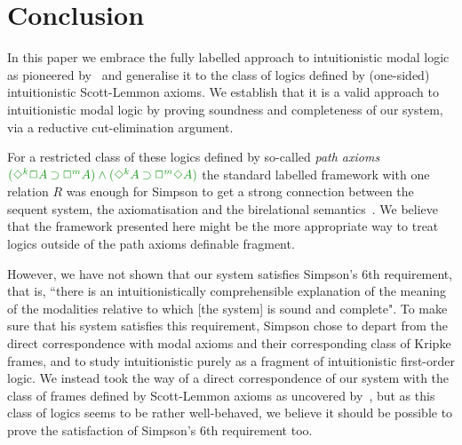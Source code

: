 \section{Conclusion}


In this paper we embrace the fully labelled approach to intuitionistic modal logic as pioneered by~\cite{maffezioli:etal:synthese13} and generalise it to the class of logics defined by (one-sided) intuitionistic Scott-Lemmon axioms.
%
We establish that it is a valid approach to intuitionistic modal logic by proving soundness and completeness of our system, via a reductive cut-elimination argument.

For a restricted class of these logics defined by so-called \emph{path axioms} $\fm{(\DIA^k\BOX A \IMP\BOX^m A) \AND (\DIA^k A \IMP \BOX^m\DIA A)}$ the standard labelled framework with one relation $R$ was enough for Simpson to get a strong connection between the sequent system, the axiomatisation and the birelational semantics~\cite{simpson:phd}.
%
%
We believe that the framework presented here might be the more appropriate way to treat logics outside of the path axioms definable fragment.

However, we have not shown that our system satisfies Simpson's 6th requirement, that is, ``there is an intuitionistically comprehensible explanation of the meaning of the modalities relative to which [the system] is sound and complete".
%
To make sure that his system satisfies this requirement, Simpson chose to depart from the direct correspondence with modal axioms and their corresponding class of Kripke frames, and to study intuitionistic purely as a fragment of intuitionistic first-order logic.
%
We instead took the way of a direct correspondence of our system with the class of frames defined by Scott-Lemmon axioms as uncovered by~\cite{plotkin:stirling:86}, but as this class of logics seems to be rather well-behaved, we believe it should be possible to prove the satisfaction of Simpson's 6th requirement too.

